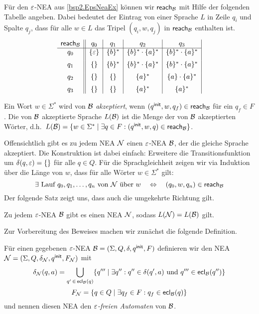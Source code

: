 {Für den $\varepsilon$-NEA aus \autoref{bsp2.EpsNeaEx} können wir $\textsf{reach}_{\mathcal{B}}$ mit Hilfe der folgenden Tabelle angeben.
Dabei bedeutet der Eintrag von einer Sprache $L$ in Zeile $q_i$ und Spalte $q_j$, dass für alle $w\in L$ das Tripel
$(q_i,w,q_j)$ in $\textsf{reach}_{\mathcal{B}}$ enthalten ist.
\[
\begin{array}{c||c|c|c|c|c|c}
   \textsf{reach}_{\mathcal{B}}  & q_0 & q_1 & q_2 & q_3\\ \hline
q_0 & \{\varepsilon\} & \{b\}^* & \{b\}^*\cdot\{a\}^* & \{b\}^*\cdot\{a\}^* \\[2mm]
q_1 & \{\}     & \{b\}^* & \{b\}^*\cdot\{a\}^* & \{b\}^*\cdot\{a\}^* \\[2mm]
q_2 & \{\}     & \{\}    & \{a\}^*             & \{a\}\cdot\{a\}^*\\[2mm]
q_3 & \{\}     & \{\}    & \{a\}^*             & \{a\}^*
\end{array}
\]

\begin{Def}\label{def:2.EpsNeaSprache}
 Ein Wort $w\in\Sigma^*$ wird von $\mathcal{B}$ \emph{akzeptiert}, wenn $(q^\mathsf{init},w,q_f)\in\textsf{reach}_{\mathcal{B}}$ für ein $q_f\in F$.
 Die von $\mathcal{B}$ akzeptierte Sprache $L(\mathcal{B})$ ist die Menge der von $\mathcal{B}$ akzeptierten Wörter, d.h.\
	$L(\mathcal{B})=\{ w\in\Sigma^* \mid \exists q\in F: (q^\mathsf{init}, w, q)\in\textsf{reach}_{\mathcal{B}} \}$.
\end{Def}

Offensichtlich gibt es zu jedem \ac{NEA} $\mathcal{N}$ einen $\varepsilon$-NEA $\mathcal{B}$, der die gleiche Sprache akzeptiert.
Die Konstruktion ist dabei einfach: Erweitere die Transitionsfunktion um $\delta(q,\varepsilon)=\{\}$ für alle $q\in Q$.
Für die Sprachgleichheit zeigen wir via Induktion über die Länge von $w$, dass für alle Wörter $w \in \Sigma^*$ gilt:
$$\exists \text{ Lauf } q_0,q_1,\ldots, q_n \text{ von $\mathcal{N}$ über } w \quad\Leftrightarrow\quad (q_0,w,q_n)\in\textsf{reach}_{\mathcal{B}}$$
Der folgende Satz zeigt uns, dass auch die umgekehrte Richtung gilt.

\begin{Satz}\label{satz:2.EpsElim}
    Zu jedem $\varepsilon$-NEA $\mathcal{B}$ gibt es einen \ac{NEA} $\mathcal{N}$, sodass $L(\mathcal{N})=L(\mathcal{B})$ gilt.
\end{Satz}
Zur Vorbereitung des Beweises machen wir zunächst die folgende Definition.

\begin{Def}
 Für einen gegebenen $\varepsilon$-NEA $\mathcal{B}= (\Sigma, Q,\delta,q^\mathsf{init},F)$ definieren wir den \acs*{NEA} $\mathcal{N}= (\Sigma, Q,\delta_{\mathcal{N}},q^\mathsf{init},F_{\mathcal{N}})$ mit
        $$\delta_{\mathcal{N}}(q,a)=\bigcup\limits_{q'\,\in\,\textsf{ecl}_{\mathcal{B}}(q)}\{q'''\mid \exists q'' : q''\in\delta(q',a) \text{ und } q'''\in\textsf{ecl}_{\mathcal{B}}(q'')\}$$
        $$F_{\mathcal{N}}=\{q\in Q\mid \exists q_f\in F: q_f\in\textsf{ecl}_{\mathcal{B}}(q)\}$$
und nennen diesen \ac{NEA} den \emph{$\varepsilon$-freien Automaten} von $\mathcal{B}$.
\end{Def}

}

